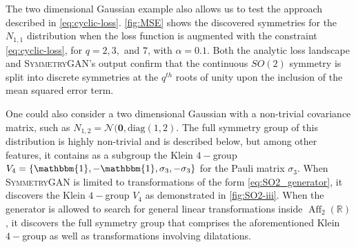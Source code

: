                 The two dimensional Gaussian example also allows us to test the approach described in \cref{eq:cyclic-loss}.
                \cref{fig:MSE} shows the discovered symmetries for the \(N_{1, 1}\) distribution when the loss function is augmented with the constraint \cref{eq:cyclic-loss}, for \(q = 2, 3,\) and \(7\), with \(\alpha = 0.1\).
                Both the analytic loss landscape and \textsc{SymmetryGAN}'s output confirm that the continuous \(SO(2)\) symmetry is split into discrete symmetries at the \(q^{th}\) roots of unity upon the inclusion of the mean squared error term.

                One could also consider a two dimensional Gaussian with a non-trivial covariance matrix, such as \(N_{1, 2} = \mathcal{N}(\mathbf{0}, \text{diag}(1, 2)\).
                The full symmetry group of this distribution is highly non-trivial and is described below, but among other features, it contains as a subgroup the Klein \(4-\)group \(V_4 = \qty{\mathbbm{1}, -\mathbbm{1}, \sigma_3, -\sigma_3}\) for the Pauli matrix \(\sigma_3\).
                When \textsc{SymmetryGAN} is limited to transformations of the form \cref{eq:SO2_generator}, it discovers the Klein \(4-\)group \(V_4\) as demonstrated in \cref{fig:SO2-iii}.
                When the generator is allowed to search for general linear transformations inside \(\operatorname{Aff}_2(\mathbb{R})\), it discovers the full symmetry group that comprises the aforementioned Klein \(4-\)group as well as transformations involving dilatations.


